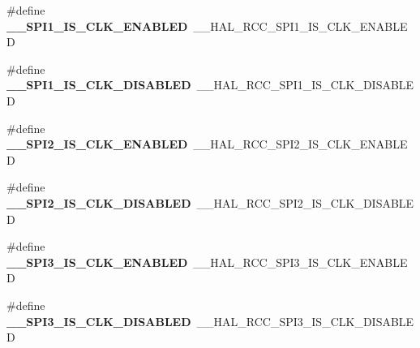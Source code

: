 \begin{DoxyCompactItemize}
\item 
\#define {\bfseries \+\_\+\+\_\+\+S\+P\+I1\+\_\+\+I\+S\+\_\+\+C\+L\+K\+\_\+\+E\+N\+A\+B\+L\+ED}~\+\_\+\+\_\+\+H\+A\+L\+\_\+\+R\+C\+C\+\_\+\+S\+P\+I1\+\_\+\+I\+S\+\_\+\+C\+L\+K\+\_\+\+E\+N\+A\+B\+L\+ED\hypertarget{group___h_a_l___r_c_c___aliased_gafea44feca9f74b3fa277a00c482b3be4}{}\label{group___h_a_l___r_c_c___aliased_gafea44feca9f74b3fa277a00c482b3be4}

\item 
\#define {\bfseries \+\_\+\+\_\+\+S\+P\+I1\+\_\+\+I\+S\+\_\+\+C\+L\+K\+\_\+\+D\+I\+S\+A\+B\+L\+ED}~\+\_\+\+\_\+\+H\+A\+L\+\_\+\+R\+C\+C\+\_\+\+S\+P\+I1\+\_\+\+I\+S\+\_\+\+C\+L\+K\+\_\+\+D\+I\+S\+A\+B\+L\+ED\hypertarget{group___h_a_l___r_c_c___aliased_ga6b94e6985c6bb5875d23a5368294a74f}{}\label{group___h_a_l___r_c_c___aliased_ga6b94e6985c6bb5875d23a5368294a74f}

\item 
\#define {\bfseries \+\_\+\+\_\+\+S\+P\+I2\+\_\+\+I\+S\+\_\+\+C\+L\+K\+\_\+\+E\+N\+A\+B\+L\+ED}~\+\_\+\+\_\+\+H\+A\+L\+\_\+\+R\+C\+C\+\_\+\+S\+P\+I2\+\_\+\+I\+S\+\_\+\+C\+L\+K\+\_\+\+E\+N\+A\+B\+L\+ED\hypertarget{group___h_a_l___r_c_c___aliased_ga8642a600a9a3192b876e4b65daa00b54}{}\label{group___h_a_l___r_c_c___aliased_ga8642a600a9a3192b876e4b65daa00b54}

\item 
\#define {\bfseries \+\_\+\+\_\+\+S\+P\+I2\+\_\+\+I\+S\+\_\+\+C\+L\+K\+\_\+\+D\+I\+S\+A\+B\+L\+ED}~\+\_\+\+\_\+\+H\+A\+L\+\_\+\+R\+C\+C\+\_\+\+S\+P\+I2\+\_\+\+I\+S\+\_\+\+C\+L\+K\+\_\+\+D\+I\+S\+A\+B\+L\+ED\hypertarget{group___h_a_l___r_c_c___aliased_gab99f19a7d6156eee3e682ac8790dba69}{}\label{group___h_a_l___r_c_c___aliased_gab99f19a7d6156eee3e682ac8790dba69}

\item 
\#define {\bfseries \+\_\+\+\_\+\+S\+P\+I3\+\_\+\+I\+S\+\_\+\+C\+L\+K\+\_\+\+E\+N\+A\+B\+L\+ED}~\+\_\+\+\_\+\+H\+A\+L\+\_\+\+R\+C\+C\+\_\+\+S\+P\+I3\+\_\+\+I\+S\+\_\+\+C\+L\+K\+\_\+\+E\+N\+A\+B\+L\+ED\hypertarget{group___h_a_l___r_c_c___aliased_gafc41a76183e7eeb5488ca82849b6c283}{}\label{group___h_a_l___r_c_c___aliased_gafc41a76183e7eeb5488ca82849b6c283}

\item 
\#define {\bfseries \+\_\+\+\_\+\+S\+P\+I3\+\_\+\+I\+S\+\_\+\+C\+L\+K\+\_\+\+D\+I\+S\+A\+B\+L\+ED}~\+\_\+\+\_\+\+H\+A\+L\+\_\+\+R\+C\+C\+\_\+\+S\+P\+I3\+\_\+\+I\+S\+\_\+\+C\+L\+K\+\_\+\+D\+I\+S\+A\+B\+L\+ED\hypertarget{group___h_a_l___r_c_c___aliased_ga36bcdd622174a4d7bea218d00c17f16f}{}\label{group___h_a_l___r_c_c___aliased_ga36bcdd622174a4d7bea218d00c17f16f}


\end{DoxyCompactItemize}
